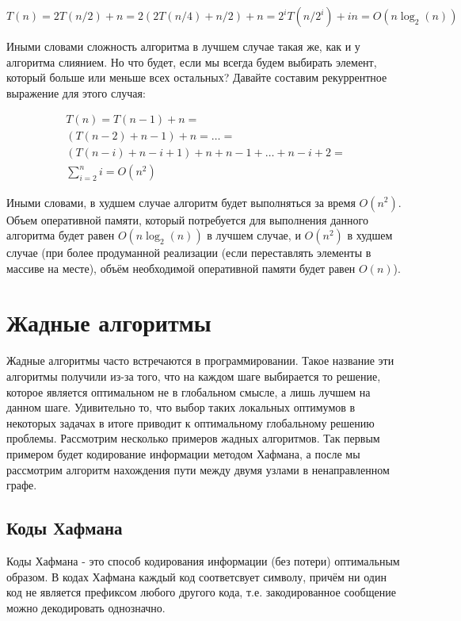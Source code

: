 $$T(n) = 2T(n/2) + n = 2(2T(n/4) + n/2) + n = 2^iT(n/2^i) + in = O(n\log_2(n))$$

Иными словами сложность алгоритма в лучшем случае такая же, как и у алгоритма слиянием.
Но что будет, если мы всегда будем выбирать элемент, который больше или меньше всех остальных?
Давайте составим рекуррентное выражение для этого случая:

\begin{equation*}
\begin{multlined}
T(n) = T(n-1) + n =  \\
(T(n-2) + n - 1) + n = \ldots = \\
(T(n-i) + n - i + 1) + n + n - 1 + \ldots + n - i + 2 = \\
\sum_{i=2}^n i = O(n^2)
\end{multlined}
\end{equation*}

Иными словами, в худшем случае алгоритм будет выполняться за время $O(n^2)$.
Объем оперативной памяти, который потребуется для выполнения данного алгоритма 
будет равен $O(n\log_2(n))$ в лучшем случае, и $O(n^2)$ в худшем случае 
(при более продуманной реализации (если переставлять элементы
в массиве на месте), объём необходимой оперативной памяти будет равен $O(n)$).

\section{Жадные алгоритмы}

Жадные алгоритмы часто встречаются в программировании. 
Такое название эти алгоритмы получили из-за того, что на каждом
шаге выбирается то решение, которое является оптимальном не в 
глобальном смысле, а лишь лучшем на данном шаге. Удивительно то, 
что выбор таких локальных оптимумов в некоторых задачах в итоге приводит к оптимальному 
глобальному решению проблемы. Рассмотрим несколько примеров жадных 
алгоритмов. Так первым примером будет кодирование информации методом 
Хафмана, а после мы рассмотрим алгоритм нахождения  
пути между двумя узлами в ненаправленном графе.

\subsection{Коды Хафмана}

Коды Хафмана - это способ кодирования информации (без потери) 
оптимальным образом. В кодах Хафмана каждый код соответсвует
символу, причём ни один код не является префиксом любого другого 
кода, т.е. закодированное сообщение можно декодировать однозначно.

